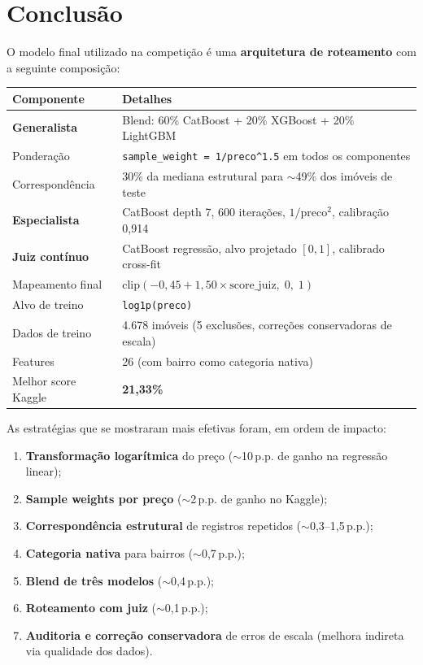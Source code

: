 \documentclass[12pt,a4paper]{article}
\begin{document}
\section{Conclusão}

O modelo final utilizado na competição é uma \textbf{arquitetura de roteamento} com a seguinte composição:

\begin{table}[h]
\centering
\begin{tabular}{ll}
\toprule
\textbf{Componente} & \textbf{Detalhes} \\
\midrule
\textbf{Generalista}   & Blend: 60\% CatBoost + 20\% XGBoost + 20\% LightGBM \\
Ponderação              & \lstinline{sample_weight = 1/preco^1.5} em todos os componentes \\
Correspondência         & 30\% da mediana estrutural para $\sim$49\% dos imóveis de teste \\
\textbf{Especialista}  & CatBoost depth 7, 600 iterações, $1/\text{preco}^2$, calibração 0,914 \\
\textbf{Juiz contínuo} & CatBoost regressão, alvo projetado $[0,1]$, calibrado cross-fit \\
Mapeamento final        & $\text{clip}(-0{,}45 + 1{,}50 \times \text{score\_juiz},\; 0,\; 1)$ \\
Alvo de treino          & \lstinline{log1p(preco)} \\
Dados de treino         & 4.678 imóveis (5 exclusões, correções conservadoras de escala) \\
Features                & 26 (com bairro como categoria nativa) \\
Melhor score Kaggle     & \textbf{21,33\%} \\
\bottomrule
\end{tabular}
\end{table}

As estratégias que se mostraram mais efetivas foram, em ordem de impacto:

\begin{enumerate}
  \item \textbf{Transformação logarítmica} do preço ($\sim$10\,p.p. de ganho na regressão linear);
  \item \textbf{Sample weights por preço} ($\sim$2\,p.p. de ganho no Kaggle);
  \item \textbf{Correspondência estrutural} de registros repetidos ($\sim$0,3--1,5\,p.p.);
  \item \textbf{Categoria nativa} para bairros ($\sim$0,7\,p.p.);
  \item \textbf{Blend de três modelos} ($\sim$0,4\,p.p.);
  \item \textbf{Roteamento com juiz} ($\sim$0,1\,p.p.);
  \item \textbf{Auditoria e correção conservadora} de erros de escala (melhora indireta via qualidade dos dados).
\end{enumerate}
\end{document}

